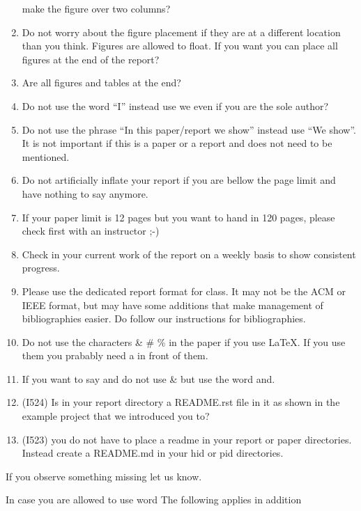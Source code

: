 \begin{enumerate}
  make the figure over two columns?
\item
  Do not worry about the figure placement if they are at a different
  location than you think. Figures are allowed to float. If you want you
  can place all figures at the end of the report?
\item
  Are all figures and tables at the end?
\item
  Do not use the word ``I'' instead use we even if you are the sole
  author?
\item
  Do not use the phrase ``In this paper/report we show'' instead use
  ``We show''. It is not important if this is a paper or a report and
  does not need to be mentioned.
\item
  Do not artificially inflate your report if you are bellow the page
  limit and have nothing to say anymore.
\item
  If your paper limit is 12 pages but you want to hand in 120 pages,
  please check first with an instructor ;-)
\item
  Check in your current work of the report on a weekly basis to show
  consistent progress.
\item
  Please use the dedicated report format for class. It may not be the
  ACM or IEEE format, but may have some additions that make management
  of bibliographies easier. Do follow our instructions for
  bibliographies.
\item
  Do not use the characters \& \# \% in the paper if you use LaTeX. If
  you use them you prabably need a in front of them.
\item
  If you want to say and do not use \& but use the word and.
\item
  (I524) Is in your report directory a README.rst file in it as shown in
  the example project that we introduced you to?
\item
  (I523) you do not have to place a readme in your report or paper
  directories. Instead create a README.md in your hid or pid
  directories.
\end{enumerate}

If you observe something missing let us know.

In case you are allowed to use word The following applies in addition

